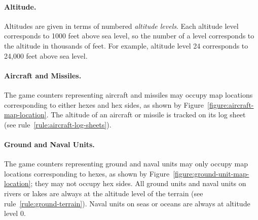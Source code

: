 {\paragraph{Altitude.}\label{rule:altitude}

Altitudes are given in terms of numbered \emph{altitude levels}. Each altitude level corresponds to 1000 feet above sea level, so the number of a level corresponds to the altitude in thousands of feet. For example, altitude level 24 corresponds to 24,000 feet above sea level.

\paragraph{Aircraft and Missiles.} 


The game counters representing aircraft and missiles may occupy map locations corresponding to either hexes and hex sides, as shown by Figure~\ref{figure:aircraft-map-location}. The altitude of an aircraft or missile is tracked on its log sheet (see rule~\ref{rule:aircraft-log-sheets}).

\paragraph{Ground and Naval Units.}

The game counters representing ground and naval units may only occupy map locations corresponding to hexes, as shown by Figure~\ref{figure:ground-unit-map-location}; they may not occupy hex sides. All ground units and naval units on rivers or lakes are always at the altitude level of the terrain (see rule~\ref{rule:ground-terrain}). Naval units on seas or oceans are always at altitude level 0.







}




\Ax{
}

